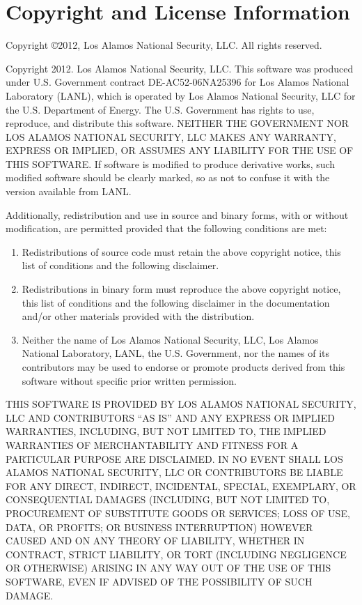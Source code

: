 \documentclass[11pt,letterpaper]{article}
\begin{document}
\section{Copyright and License Information}

Copyright \copyright 2012, Los Alamos National Security, LLC.
All rights reserved.

Copyright 2012. Los Alamos National Security, LLC.
This software was produced under U.S. Government contract
DE-AC52-06NA25396 for Los Alamos National Laboratory (LANL), which is
operated by Los Alamos National Security, LLC for the U.S. Department
of Energy. The U.S. Government has rights to use, reproduce, and
distribute this software. NEITHER THE GOVERNMENT NOR LOS ALAMOS
NATIONAL SECURITY, LLC MAKES ANY WARRANTY, EXPRESS OR IMPLIED, OR
ASSUMES ANY LIABILITY FOR THE USE OF THIS SOFTWARE. If software is
modified to produce derivative works, such modified software should be
clearly marked, so as not to confuse it with the version available from
LANL.

Additionally, redistribution and use in source and binary forms, with
or without modification, are permitted provided that the following
conditions are met:

\begin{enumerate}
\item Redistributions of source code must retain the above copyright
   notice, this list of conditions and the following disclaimer.
\item Redistributions in binary form must reproduce the above
   copyright notice, this list of conditions and the following
   disclaimer in the documentation and/or other materials provided
   with the distribution.
\item Neither the name of Los Alamos National Security, LLC, Los Alamos
   National Laboratory, LANL, the U.S. Government, nor the names of its
   contributors may be used to endorse or promote products derived from
   this software without specific prior written permission.
\end{enumerate}

THIS SOFTWARE IS PROVIDED BY LOS ALAMOS NATIONAL SECURITY, LLC AND
CONTRIBUTORS ``AS IS'' AND ANY EXPRESS OR IMPLIED WARRANTIES, INCLUDING,
BUT NOT LIMITED TO, THE IMPLIED WARRANTIES OF MERCHANTABILITY AND FITNESS
FOR A PARTICULAR PURPOSE ARE DISCLAIMED. IN NO EVENT SHALL LOS ALAMOS
NATIONAL SECURITY, LLC OR CONTRIBUTORS BE LIABLE FOR ANY DIRECT,
INDIRECT, INCIDENTAL, SPECIAL, EXEMPLARY, OR CONSEQUENTIAL DAMAGES
(INCLUDING, BUT NOT LIMITED TO, PROCUREMENT OF SUBSTITUTE GOODS OR
SERVICES; LOSS OF USE, DATA, OR PROFITS; OR BUSINESS INTERRUPTION)
HOWEVER CAUSED AND ON ANY THEORY OF LIABILITY, WHETHER IN CONTRACT,
STRICT LIABILITY, OR TORT (INCLUDING NEGLIGENCE OR OTHERWISE) ARISING
IN ANY WAY OUT OF THE USE OF THIS SOFTWARE, EVEN IF ADVISED OF THE
POSSIBILITY OF SUCH DAMAGE.
\end{document}
